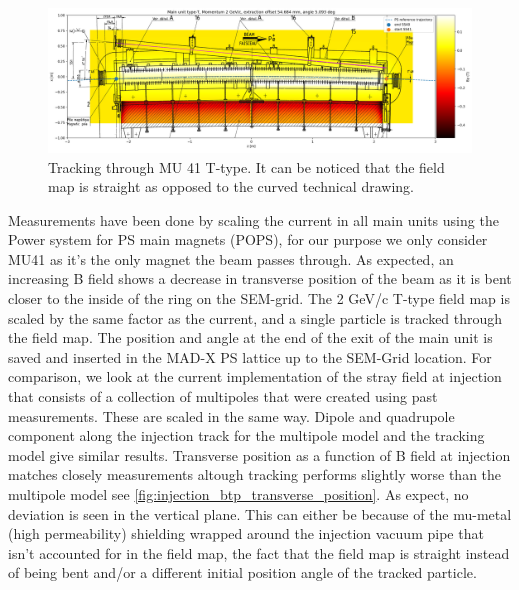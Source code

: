 \documentclass[a4paper,
               biblatex,     %
               keeplastbox,   %
               ]{jacow}
\begin{document}
\begin{figure}[!htb]
   \centering
   \includegraphics*[width=1.0\columnwidth]{injection_btp.png}
   \caption{Tracking through MU 41 T-type. It can be noticed that the field map is straight as opposed to the curved technical drawing.}
   \label{fig:injection_btp}
\end{figure}

Measurements have been done by scaling the current in all main units using the Power system for PS main magnets (POPS), for our purpose we only consider MU41 as it's the only magnet the beam passes through. As expected, an increasing B field shows a decrease in transverse position of the beam as it is bent closer to the inside of the ring on the SEM-grid. The 2 GeV/c T-type field map is scaled by the same factor as the current, and a single particle is tracked through the field map. The position and angle at the end of the exit of the main unit is saved and inserted in the MAD-X PS lattice up to the SEM-Grid location. For comparison, we look at the current implementation of the stray field at injection that consists of a collection of multipoles that were created using past measurements. These are scaled in the same way. Dipole and quadrupole component along the injection track for the multipole model and the tracking model give similar results. Transverse position as a function of B field at injection matches closely measurements altough tracking performs slightly worse than the multipole model see \ref{fig:injection_btp_transverse_position}. As expect, no deviation is seen in the vertical plane. This can either be because of the mu-metal (high permeability) shielding wrapped around the injection vacuum pipe that isn't accounted for in the field map, the fact that the field map is straight instead of being bent and/or a different initial position angle of the tracked particle.
\end{document}
